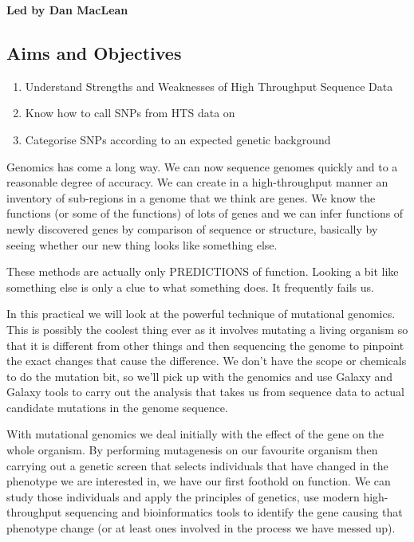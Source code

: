 \documentclass[12pt,]{book}
\providecommand{\tightlist}{%
  \setlength{\itemsep}{0pt}\setlength{\parskip}{0pt}}
\begin{document}
\textbf{Led by Dan MacLean}

\subsection*{Aims and Objectives}\label{aims-and-objectives-1}

\begin{enumerate}
\def\labelenumi{\arabic{enumi}.}
\tightlist
\item
  Understand Strengths and Weaknesses of High Throughput Sequence Data
\item
  Know how to call SNPs from HTS data on
\item
  Categorise SNPs according to an expected genetic background
\end{enumerate}

Genomics has come a long way. We can now sequence genomes quickly and to
a reasonable degree of accuracy. We can create in a high-throughput
manner an inventory of sub-regions in a genome that we think are genes.
We know the functions (or some of the functions) of lots of genes and we
can infer functions of newly discovered genes by comparison of sequence
or structure, basically by seeing whether our new thing looks like
something else.

These methods are actually only PREDICTIONS of function. Looking a bit
like something else is only a clue to what something does. It frequently
fails us.

In this practical we will look at the powerful technique of mutational
genomics. This is possibly the coolest thing ever as it involves
mutating a living organism so that it is different from other things and
then sequencing the genome to pinpoint the exact changes that cause the
difference. We don't have the scope or chemicals to do the mutation bit,
so we'll pick up with the genomics and use Galaxy and Galaxy tools to
carry out the analysis that takes us from sequence data to actual
candidate mutations in the genome sequence.

With mutational genomics we deal initially with the effect of the gene
on the whole organism. By performing mutagenesis on our favourite
organism then carrying out a genetic screen \citep{Page:2002ji} that
selects individuals that have changed in the phenotype we are interested
in, we have our first foothold on function. We can study those
individuals and apply the principles of genetics, use modern
high-throughput sequencing and bioinformatics tools to identify the gene
causing that phenotype change (or at least ones involved in the process
we have messed up).
\end{document}
